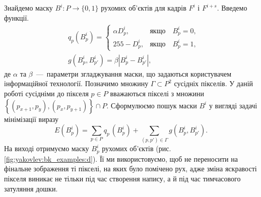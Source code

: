 Знайдемо маску $B^{i}:P \rightarrow \{0,1\}$ рухомих
об'єктів для кадрів \(F^{i}\) і \(F^{i + s}\).
Введемо функції.
\begin{align*}
	 & q_{p}(B_{p}^{i}) =
	\begin{cases}
		\alpha D_{p}^{i}, & \textit{якщо} \quad B_{p}^{i} = 0,  \\
		255 - D_{p}^{i},  & \textit{якщо} \quad B_{p}^{i} = 1 ,
	\end{cases}     \\
	 & g(B_{p}^{i},B_{p'}^{i}) = \beta|B_{p}^{i} - B_{p'}^{i}|,
\end{align*}
де \(\alpha\) та \(\beta\)~---~параметри згладжування маски, що задаються
користувачем інформаційної технології. Позначимо множину
$\Gamma \subset P^{2}$ сусідніх пікселів. У даній роботі сусідніми до
пікселя \(p \in P\) вважаються пікселі з множини
\(\left\{ \left( p_{x + 1},p_{y} \right),\left( p_{x},p_{y + 1} \right) \right\} \cap P\).
Сформулюємо пошук маски \(B^{i}\) у вигляді задачі мінімізації виразу
\begin{equation*}
	E\left( B_{p}^{i} \right) = \sum_{p \in P}^{}{q_{{p\ }}( B_{p}^{i}) +}\sum_{(p,p') \in \Gamma}^{}g(B_{p}^{i},B_{p'}^{i}).
\end{equation*}
На виході отримуємо маску \(B_{p}^{i}\) рухомих об'єктів (рис.
\ref{fig:yakovlev:bk_examples:d}).
Її ми використовуємо, щоб не переносити на фінальне зображення ті
пікселі, на яких було помічено рух, адже зміна яскравості пікселя
виникає не тільки під час створення напису, а й під час тимчасового
затуляння дошки.
